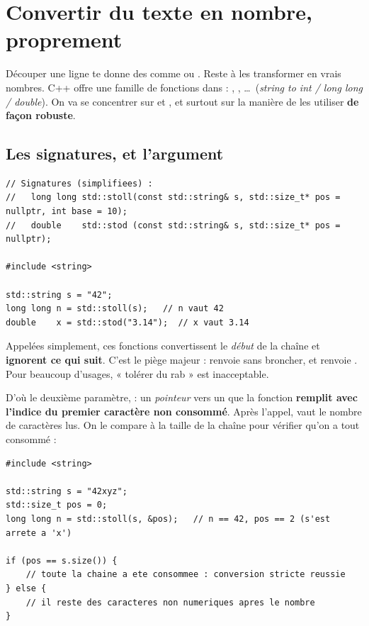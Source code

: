 \documentclass[11pt]{article}
\begin{document}
\section{Convertir du texte en nombre, proprement}

Découper une ligne te donne des  comme  ou
. Reste à les transformer en vrais nombres. C++ offre une famille de
fonctions dans  : , ,
\ldots\ (\emph{string to int / long long / double}). On va se
concentrer sur  et , et surtout sur la manière de
les utiliser \textbf{de façon robuste}.

\subsection*{Les signatures, et l'argument }

\begin{lstlisting}
// Signatures (simplifiees) :
//   long long std::stoll(const std::string& s, std::size_t* pos = nullptr, int base = 10);
//   double    std::stod (const std::string& s, std::size_t* pos = nullptr);

#include <string>

std::string s = "42";
long long n = std::stoll(s);   // n vaut 42
double    x = std::stod("3.14");  // x vaut 3.14
\end{lstlisting}

Appelées simplement, ces fonctions convertissent le \emph{début} de la chaîne et
\textbf{ignorent ce qui suit}. C'est le piège majeur : 
renvoie  sans broncher, et  renvoie .
Pour beaucoup d'usages, « tolérer du rab » est inacceptable.

D'où le deuxième paramètre,  : un \emph{pointeur} vers un
 que la fonction \textbf{remplit avec l'indice du premier
caractère non consommé}. Après l'appel,  vaut le nombre de caractères
lus. On le compare à la taille de la chaîne pour vérifier qu'on a tout consommé :

\begin{lstlisting}
#include <string>

std::string s = "42xyz";
std::size_t pos = 0;
long long n = std::stoll(s, &pos);   // n == 42, pos == 2 (s'est arrete a 'x')

if (pos == s.size()) {
    // toute la chaine a ete consommee : conversion stricte reussie
} else {
    // il reste des caracteres non numeriques apres le nombre
}
\end{lstlisting}
\end{document}
